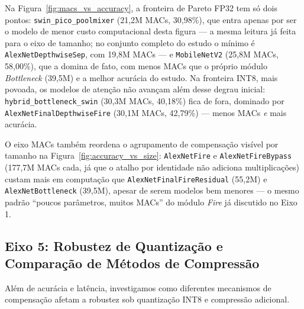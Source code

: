 \documentclass[conference]{IEEEtran}
\begin{document}
Na Figura~\ref{fig:macs_vs_accuracy}, a fronteira de Pareto FP32 tem só dois pontos:
\texttt{swin\_pico\_poolmixer} (21,2M MACs, 30,98\%), que entra apenas por ser o modelo de menor
custo computacional desta figura — a mesma leitura já feita para o eixo de tamanho; no conjunto
completo do estudo o mínimo é \texttt{AlexNetDepthwiseSep}, com 19,8M MACs — e
\texttt{MobileNetV2} (25,8M MACs, 58,00\%), que a domina de fato, com menos MACs que o próprio
módulo \textit{Bottleneck} (39,5M) e a melhor acurácia do estudo. Na fronteira INT8, mais povoada,
os modelos de atenção não avançam além desse degrau inicial: \texttt{hybrid\_bottleneck\_swin}
(30,3M MACs, 40,18\%) fica de fora, dominado por \texttt{AlexNetFinalDepthwiseFire} (30,1M MACs,
42,79\%) — menos MACs \emph{e} mais acurácia.

O eixo MACs também reordena o agrupamento de compensação visível por tamanho na
Figura~\ref{fig:accuracy_vs_size}: \texttt{AlexNetFire} e \texttt{AlexNetFireBypass} (177,7M MACs
cada, já que o atalho por identidade não adiciona multiplicações) custam mais em computação que
\texttt{AlexNetFinalFireResidual} (55,2M) e \texttt{AlexNetBottleneck} (39,5M), apesar de serem
modelos bem menores — o mesmo padrão ``poucos parâmetros, muitos MACs'' do módulo
\textit{Fire} já discutido no Eixo 1.

\subsection{Eixo 5: Robustez de Quantização e Comparação de Métodos de Compressão}

Além de acurácia e latência, investigamos como diferentes mecanismos de compensação afetam a
robustez sob quantização INT8 e compressão adicional.
\end{document}
